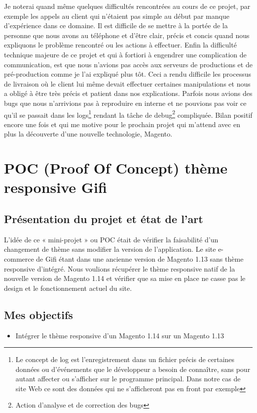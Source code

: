 \documentclass[a4paper,11pt,twoside]{report}
\begin{document}
    Je noterai quand même quelques difficultés rencontrées au cours de ce projet, par exemple les appels au client qui n'étaient pas simple au début par manque d'expérience dans ce domaine. Il est difficile de se mettre à la portée de la personne que nous avons au téléphone et d'être clair, précis et concis quand nous expliquons le problème rencontré ou les actions à effectuer. 
    Enfin la difficulté technique majeure de ce projet et qui à fortiori à engendrer une complication de communication, est que nous n'avions pas accès aux serveurs de productions et de pré-production comme je l'ai expliqué plus tôt. Ceci a rendu difficile les processus de livraison où le client lui même devait effectuer certaines manipulations et nous a obligé à être très précis et patient dans nos explications. Parfois nous avions des bugs que nous n'arrivions pas à reproduire en interne et ne pouvions pas voir ce qu'il se passait dans les logs\footnote{Le concept de log est l'enregistrement dans un fichier précis de certaines données ou d'événements que le développeur a besoin de connaître, sans pour autant affecter ou s'afficher sur le programme principal. Dans notre cas de site Web ce sont des données qui ne s'afficheront pas en front par exemple} rendant la tâche de debug\footnote{Action d'analyse et de correction des bugs} compliquée. Bilan positif encore une fois et qui me motive pour le prochain projet qui m'attend avec en plus la découverte d'une nouvelle technologie, Magento.
    
    \newpage
    
  \section{POC (Proof Of Concept) thème responsive Gifi}
    \subsection*{Présentation du projet et état de l'art}
    L'idée de ce « mini-projet » ou POC était de vérifier la faisabilité d'un changement de thème sans modifier la version de l'application. Le site e-commerce de Gifi étant dans une ancienne version de Magento 1.13 sans thème responsive d'intégré. Nous voulions récupérer le thème responsive natif de la nouvelle version de Magento 1.14 et vérifier que sa mise en place ne casse pas le design et le fonctionnement actuel du site. 
    \subsection*{Mes objectifs}
      \begin{itemize}

	\item Intégrer le thème responsive d'un Magento 1.14 sur un Magento 1.13 

      \end{itemize}
\end{document}
